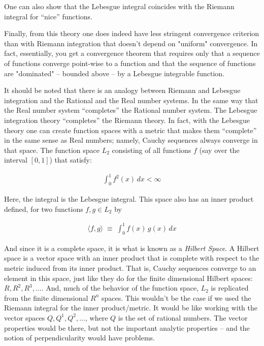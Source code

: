 \documentclass{article}
\begin{document}
One can also show that the Lebesgue integral coincides with the Riemann integral 
for ``nice'' functions.

Finally, from this theory one does indeed have less stringent convergence 
criterion than with Riemann integration that doesn't depend on "uniform" convergence.
In fact, essentially, you get a convergence theorem that requires only that a sequence
of functions converge point-wise to a function and that the sequence of functions 
are "dominated" -- bounded above -- by a Lebesgue integrable function.

It should be noted that there is an analogy between Riemann and Lebesgue integration 
and the Rational and the Real number systems. In the same way that the Real number 
system ``completes'' the Rational number system. The Lebesgue integration theory ``completes''
the Riemann theory. In fact, with the Lebesgue theory one can create function 
spaces with a metric that makes them ``complete'' in the same sense as Real 
numbers; namely, Cauchy sequences always converge in that space. 
The function space $L_2$ consisting of
all functions $f$ (say over the interval $[0,1]$) that satisfy:

\begin{eqnarray}
\int_0^1 f^2(x) \, dx < \infty
\end{eqnarray}

Here, the integral is the Lebesgue integral. This space also has an inner 
product defined, for two functions $f, g \in L_2$ by

\begin{eqnarray}
\langle f, g \rangle \; \equiv \; \int_0^1 f(x)\, g(x)\, dx
\end{eqnarray}

And since it is a complete space, it is what is known as a {\em Hilbert Space}.
A Hilbert space is a vector space with an inner product that is complete with 
respect to the metric induced from its inner product. 
That is, Cauchy sequences converge to an element in this
space, just like they do for the finite dimensional Hilbert spaces: $R, R^2, R^3, \ldots$.
And, much of the behavior of the function space, $L_2$ is replicated from 
the finite dimensional $R^n$ spaces. This wouldn't be the case if we used
the Riemann integral for the inner product/metric. It would be like
working with the vector spaces $Q, Q^1, Q^2, \ldots$, where $Q$ is the set 
of rational numbers. The vector properties would be there, but not 
the important analytic properties -- and the notion of perpendicularity would
have problems.
\end{document}
